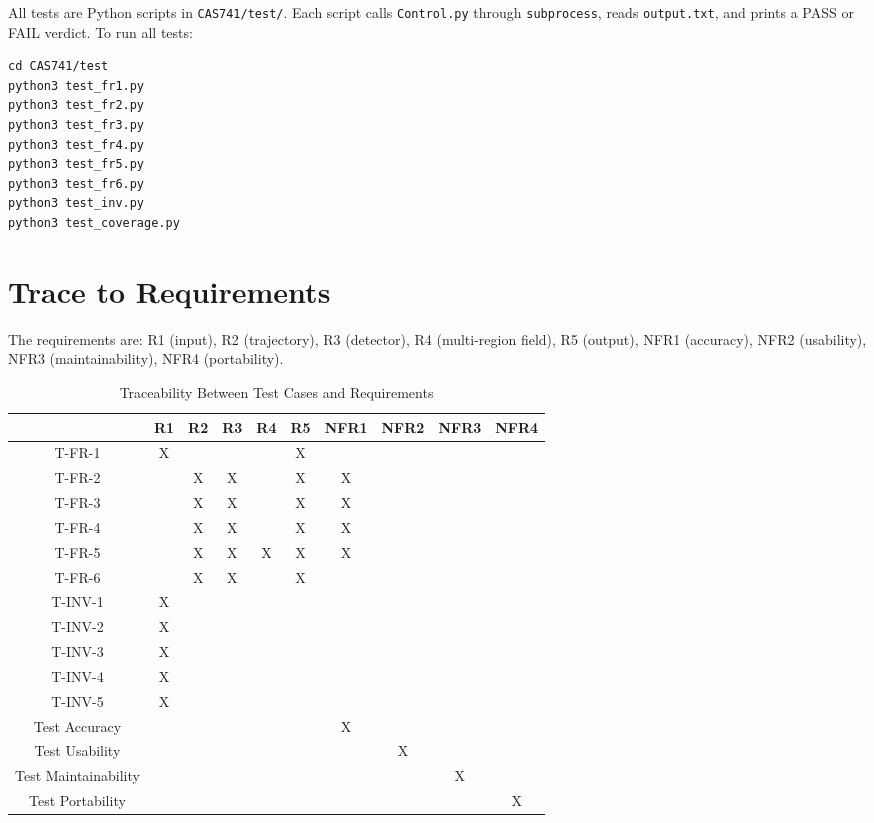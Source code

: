 \documentclass[12pt, titlepage]{article}
\begin{document}
All tests are Python scripts in \texttt{CAS741/test/}.
Each script calls \texttt{Control.py} through \texttt{subprocess},
reads \texttt{output.txt}, and prints a PASS or FAIL verdict.
To run all tests:
\begin{verbatim}
cd CAS741/test
python3 test_fr1.py
python3 test_fr2.py
python3 test_fr3.py
python3 test_fr4.py
python3 test_fr5.py
python3 test_fr6.py
python3 test_inv.py
python3 test_coverage.py
\end{verbatim}

\section{Trace to Requirements}

The requirements are: R1 (input), R2 (trajectory), R3 (detector), R4
(multi-region field), R5 (output), NFR1 (accuracy), NFR2 (usability),
NFR3 (maintainability), NFR4 (portability).

\begin{table}[ht]
\caption{Traceability Between Test Cases and Requirements}
\label{tab:trace-req}
\centering
\begin{tabular}{|c|c|c|c|c|c|c|c|c|c|}
\hline
         & R1 & R2 & R3 & R4 & R5 & NFR1 & NFR2 & NFR3 & NFR4 \\
\hline
T-FR-1   & X  &    &    &    & X  &      &      &      &      \\
\hline
T-FR-2   &    & X  & X  &    & X  & X    &      &      &      \\
\hline
T-FR-3   &    & X  & X  &    & X  & X    &      &      &      \\
\hline
T-FR-4   &    & X  & X  &    & X  & X    &      &      &      \\
\hline
T-FR-5   &    & X  & X  & X  & X  & X    &      &      &      \\
\hline
T-FR-6   &    & X  & X  &    & X  &      &      &      &      \\
\hline
T-INV-1  & X  &    &    &    &    &      &      &      &      \\
\hline
T-INV-2  & X  &    &    &    &    &      &      &      &      \\
\hline
T-INV-3  & X  &    &    &    &    &      &      &      &      \\
\hline
T-INV-4  & X  &    &    &    &    &      &      &      &      \\
\hline
T-INV-5  & X  &    &    &    &    &      &      &      &      \\
\hline
Test Accuracy      &    &    &    &    &    & X    &      &      &      \\
\hline
Test Usability     &    &    &    &    &    &      & X    &      &      \\
\hline
Test Maintainability &  &    &    &    &    &      &      & X    &      \\
\hline
Test Portability   &    &    &    &    &    &      &      &      & X    \\
\hline
\end{tabular}
\end{table}
\end{document}
